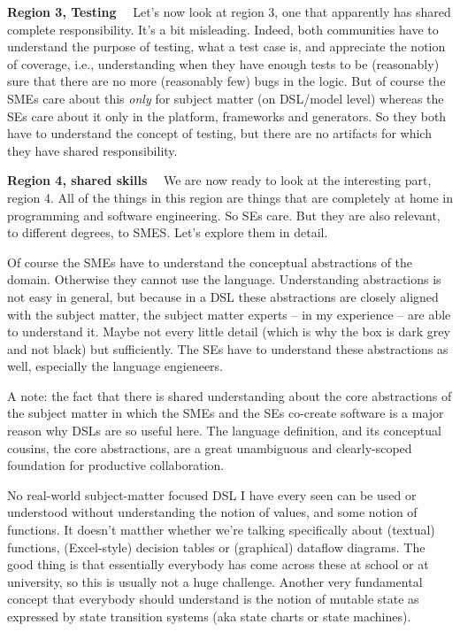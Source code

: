 \documentclass[runningheads]{llncs}
\newcommand\parhead[1]{\vspace{1mm}\noindent\textbf{{#1}}\ \ }
\begin{document}
\parhead{Region 3, Testing} Let's now look at region 3, one that apparently has
shared complete responsibility. It's a bit misleading. Indeed, both communities
have to understand the purpose of testing, what a test case is, and appreciate
the notion of coverage, i.e., understanding when they have enough tests to be
(reasonably) sure that there are no more (reasonably few) bugs in the logic. But
of course the SMEs care about this \emph{only} for subject matter (on DSL/model
level) whereas the SEs care about it only in the platform, frameworks and
generators. So they both have to understand the concept of testing, but there
are no artifacts for which they have shared responsibility.

\parhead{Region 4, shared skills} We are now ready to look at the interesting
part, region 4. All of the things in this region are things that are completely
at home in programming and software engineering. So SEs care. But they are also
relevant, to different degrees, to SMES. Let's explore them in detail.

Of course the SMEs have to understand the conceptual abstractions of the domain.
Otherwise they cannot use the language.
Understanding abstractions is not easy in general, but because in a DSL these
abstractions are closely aligned with the subject matter, the subject matter
experts -- in my experience -- are able to understand it. Maybe not every little
detail (which is why the box is dark grey and not black) but sufficiently. The
SEs have to understand these abstractions as well, especially the language
engieneers. 

A note: the fact that there is shared understanding about the core abstractions
of the subject matter in which the SMEs and the SEs co-create software is a major
reason why DSLs are so useful here. The language definition, and its conceptual
cousins, the core abstractions, are a great unambiguous and clearly-scoped
foundation for productive collaboration.

No real-world subject-matter focused DSL I have every seen can be used or
understood without understanding the notion of values, and some notion of
functions. It doesn't matther whether we're talking specifically about (textual)
functions, (Excel-style) decision tables or (graphical) dataflow diagrams. The
good thing is that essentially everybody has come across these at school or
at university, so this is usually not a huge challenge. Another very fundamental
concept that everybody should understand is the notion of mutable state
as expressed by state transition systems (aka state charts or state machines).
\end{document}
